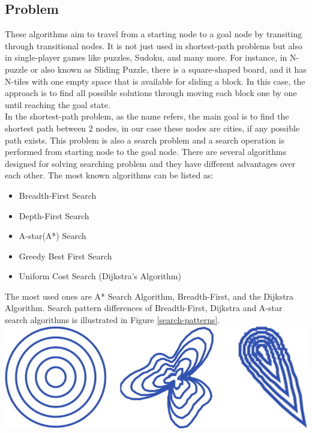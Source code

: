 \documentclass{IEEEtran}
\begin{document}
\subsection{Problem}
These algorithms aim to travel from a starting node to a goal node by transiting through transitional nodes. It is not just used in shortest-path problems but also in single-player games like puzzles, Sudoku, and many more. For instance, in N-puzzle or also known as Sliding Puzzle, there is a square-shaped board, and it has N-tiles with one empty space that is available for sliding a block. In this case, the approach is to find all possible solutions through moving each block one by one until reaching the goal state.\\

In the shortest-path problem, as the name refers, the main goal is to find the shortest path between 2 nodes, in our case these nodes are cities, if any possible path exists. \cite{shortest-path} This problem is also a search problem and a search operation is performed from starting node to the goal node. There are several algorithms designed for solving searching problem and they have different advantages over each other. The most known algorithms can be listed as:\\
\begin{itemize}
	\item Breadth-First Search
	\item Depth-First Search
	\item A-star(A*) Search
	\item Greedy Best First Search
	\item Uniform Cost Search (Dijkstra's Algorithm)
\end{itemize}
The most used ones are A* Search Algorithm, Breadth-First, and the Dijkstra Algorithm. \cite{astar-redblob} Search pattern differences of Breadth-First, Dijkstra and A-star search algorithms is illustrated in Figure \ref{search-patterns}. \\

\includegraphics[scale=1.35]{search.jpg}
\end{document}
